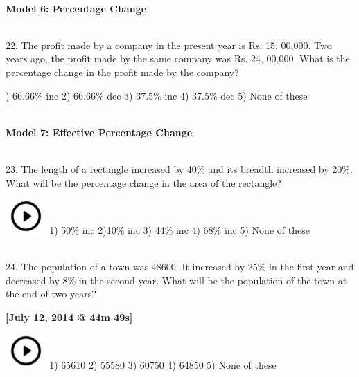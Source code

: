 \documentclass{article}
\begin{document}
\noindent \textbf{\\ Model 6: Percentage Change \\}

\noindent \\ 22. The profit made by a company in the present year is Rs. 15, 00,000. Two years ago, the profit  made by the same company was Rs. 24, 00,000. What is the percentage change in the profit made by the company?

\noindent 

) 66.66\%  inc       2) 66.66\% dec  3) 37.5\% inc     4) 37.5\% dec    5) None of these

\noindent 

\noindent 

\noindent 

\noindent \textbf{\\ Model 7: Effective Percentage Change \\}

\noindent 

\noindent \\ 23. The length of a rectangle increased by 40\% and its breadth increased by 20\%. What will be the percentage change in the area of the rectangle?

\noindent \includegraphics*[width=0.61in, height=0.52in]{images/image1} 1) 50\% inc              2)10\% inc         3) 44\% inc        4) 68\% inc        5) None of these

\noindent 

\noindent 

\noindent 
\newpage
\noindent \\ 24. The population of a town was 48600. It increased by 25\% in the first year and decreased by 8\% in the second year. What will be the population of the town at the end of two years?

\noindent \textbf{[July 12, 2014 @ 44m 49s]}

\noindent 

\noindent \includegraphics*[width=0.61in, height=0.52in]{images/image1} 1) 65610                  2) 55580           3) 60750           4) 64850           5) None of these
\end{document}
